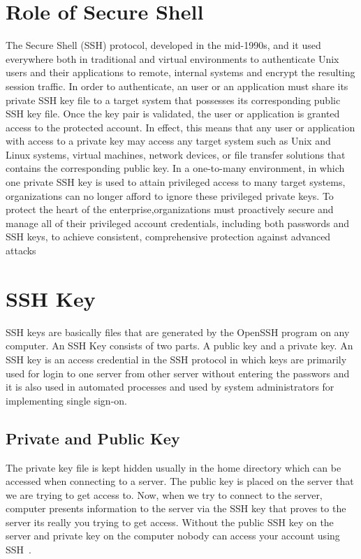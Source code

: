 \section{Role of Secure Shell}
The Secure Shell (SSH) protocol, developed in the mid-1990s, and it  
used everywhere both in traditional and virtual environments to 
authenticate Unix users and their applications to remote, 
internal systems and encrypt the resulting session traffic. 
In order to authenticate, an user or an application must share
its private SSH key file to a target system that possesses its 
corresponding public SSH key file. 
Once the key pair is validated, the user or application is granted 
access to the protected account. In effect, this means that any user
or application with access to a private key may access any target 
system such as Unix and Linux systems, virtual machines, network 
devices, or file transfer solutions that contains the corresponding
public key.
In a one-to-many environment, in which one private SSH key is used 
to attain privileged access to many target systems, organizations 
can no longer afford to ignore these privileged private keys. 
To protect the heart of the enterprise,organizations must 
proactively secure and manage all of their privileged account 
credentials, including both passwords and SSH keys, to achieve
consistent, comprehensive protection against advanced 
attacks~\cite{hid-sp18-513-cyberark}

\section{SSH Key}
SSH keys are basically files that are generated by the OpenSSH program on
any computer. An SSH Key consists of two parts. A public key and a private 
key. An SSH key is an access credential in the SSH protocol in which
keys are primarily used for login to one server from other server 
without entering the passwors and it is also used in automated processes
and used by system administrators for implementing single sign-on.

\subsection{Private and Public Key}

The private key file is kept hidden usually in the home directory 
which can be accessed when connecting to a server. The public key is placed 
on the server that we are trying to get access to. Now, when we try to 
connect to the server, computer presents information to the server via the 
SSH key that proves to the server its really you trying to get access. 
Without the public SSH key on the server and private key on the computer
nobody can access your account using SSH~\cite{hid-sp18-513-sshkeyinc}.


